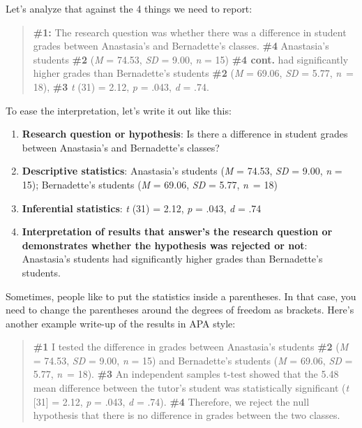 \documentclass[
]{book}
\providecommand{\tightlist}{%
  \setlength{\itemsep}{0pt}\setlength{\parskip}{0pt}}
\begin{document}
Let's analyze that against the 4 things we need to report:

\begin{quote}
\textbf{\#1:} The research question was whether there was a difference in student grades between Anastasia's and Bernadette's classes. \textbf{\#4} Anastasia's students \textbf{\#2} (\emph{M} = 74.53, \emph{SD} = 9.00, \emph{n} = 15) \textbf{\#4 cont.} had significantly higher grades than Bernadette's students \textbf{\#2} (\emph{M} = 69.06, \emph{SD} = 5.77, \emph{n}~= 18), \textbf{\#3} \emph{t} (31) = 2.12, \emph{p} = .043, \emph{d} = .74.
\end{quote}

To ease the interpretation, let's write it out like this:

\begin{enumerate}
\def\labelenumi{\arabic{enumi}.}
\tightlist
\item
  \textbf{Research question or hypothesis}: Is there a difference in student grades between Anastasia's and Bernadette's classes?
\item
  \textbf{Descriptive statistics}: Anastasia's students (\emph{M} = 74.53, \emph{SD} = 9.00, \emph{n} = 15); Bernadette's students (\emph{M} = 69.06, \emph{SD} = 5.77, \emph{n}~= 18)
\item
  \textbf{Inferential statistics}: \emph{t} (31) = 2.12, \emph{p} = .043, \emph{d} = .74
\item
  \textbf{Interpretation of results that answer's the research question or demonstrates whether the hypothesis was rejected or not}: Anastasia's students had significantly higher grades than Bernadette's students.
\end{enumerate}

Sometimes, people like to put the statistics inside a parentheses. In that case, you need to change the parentheses around the degrees of freedom as brackets. Here's another example write-up of the results in APA style:

\begin{quote}
\textbf{\#1} I tested the difference in grades between Anastasia's students \textbf{\#2} (\emph{M} = 74.53, \emph{SD} = 9.00, \emph{n} = 15) and Bernadette's students (\emph{M} = 69.06, \emph{SD} = 5.77, \emph{n}~= 18). \textbf{\#3} An independent samples t-test showed that the 5.48 mean difference between the tutor's student was statistically significant (\emph{t} {[}31{]} = 2.12, \emph{p} = .043, \emph{d} = .74). \textbf{\#4} Therefore, we reject the null hypothesis that there is no difference in grades between the two classes.
\end{quote}
\end{document}
